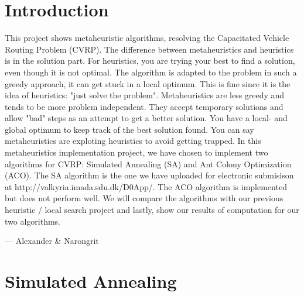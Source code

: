 \documentclass[12pt]{article}
\begin{document}

\tableofcontents
\pagebreak


\section{Introduction}

This project shows metaheuristic algorithms, resolving the Capacitated Vehicle Routing Problem (CVRP). The difference between metaheuristics and heuristics is in 
the solution part. For heuristics, you are trying your best to find a solution, even though it is not optimal. The algorithm is adapted to the problem
in such a greedy approach, it can get stuck in a local optimum. This is fine since it is the idea of heuristics: "just solve the problem". 
\newline
Metaheuristics are less greedy and tends to be more problem independent. They accept temporary solutions and allow "bad" steps as an attempt to get
a better solution. You have a local- and global optimum to keep track of the best solution found. You can say metaheuristics are exploting
heuristics to avoid getting trapped. 
\newline
In this metaheuristics implementation project, we have chosen to implement two algorithms for CVRP: Simulated Annealing (SA) and Ant Colony Optimization (ACO). 
The SA algorithm is the one we have uploaded for electronic submisison at http://valkyria.imada.sdu.dk/D0App/. The ACO algorithm is implemented but does not perform well.
We will compare the algorithms with our previous heuristic / local search project and lastly, show our results of computation for our two algorithms.

\hspace{1 cm}--- Alexander \& Narongrit

\newpage

\section{Simulated Annealing}
\end{document}
